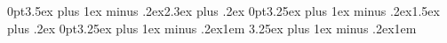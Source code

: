 \titlespacing*{\section} {0pt}{3.5ex plus 1ex minus .2ex}{2.3ex plus .2ex}
\titlespacing*{\subsection} {0pt}{3.25ex plus 1ex minus .2ex}{1.5ex plus .2ex}
\titlespacing*{\paragraph} {0pt}{3.25ex plus 1ex minus .2ex}{1em}
\titlespacing*{\subparagraph} {\parindent}{3.25ex plus 1ex minus .2ex}{1em}
